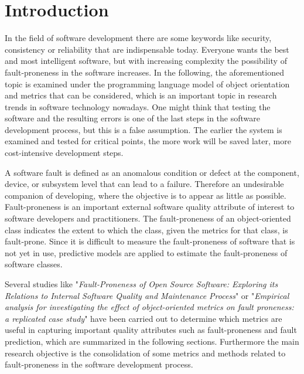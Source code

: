 \section{Introduction}

In the field of software development there are some keywords like security, consistency or reliability that are indispensable today. Everyone wants the best and most intelligent software, but with increasing complexity the possibility of fault-proneness in the software increases. In the following, the aforementioned topic is examined under the programming language model of object orientation and metrics that can be considered, which is an important topic in research trends in software technology nowadays.
One might think that testing the software and the resulting errors is one of the last steps in the software development process, but this is a false assumption. The earlier the system is examined and tested for critical points, the more work will be saved later, more cost-intensive development steps.

A software fault is defined as an anomalous condition or defect at the component, device, or subsystem level that can lead to a failure. Therefore an undesirable companion of developing, where the objective is to appear as little as possible.
Fault-proneness is an important external software quality attribute of interest to software developers and practitioners. The fault-proneness of an object-oriented class indicates the extent to which the class, given the metrics for that class, is fault-prone. Since it is difficult to measure the fault-proneness of software that is not yet in use, predictive models are applied to estimate the fault-proneness of software classes.

Several studies like "\textit{Fault-Proneness of Open Source Software: Exploring its Relations to Internal Software Quality and Maintenance Process}" \cite{kozlov2013fault} or "\textit{Empirical analysis for investigating the effect of object-oriented metrics on fault proneness: a replicated case study}" \cite{b2aggarwal2009empirical} have been carried out to determine which metrics are useful in capturing important quality attributes such as fault-proneness  and fault prediction, which are summarized in the following sections.
Furthermore the main research objective is the consolidation of some metrics and methods related to fault-proneness in the software development process.

